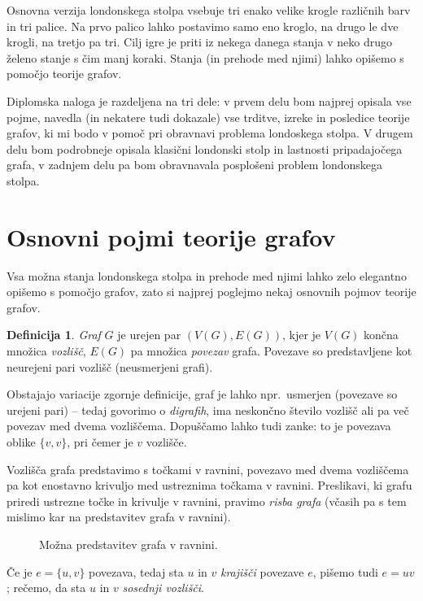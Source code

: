 \documentclass[12pt,a4paper]{amsart}
\theoremstyle{definition} %
\newtheorem{definicija}{Definicija}[section]
\theoremstyle{plain} %
\newcommand{\vozlisca}[1][G]{\ensuremath{V(#1)}}
\newcommand{\povezave}[1][G]{\ensuremath{E(#1)}}
\begin{document}
Osnovna verzija londonskega stolpa vsebuje tri enako velike krogle različnih barv in tri palice. Na prvo palico lahko postavimo samo eno kroglo, na drugo le dve krogli, na tretjo pa tri. Cilj igre je priti iz nekega danega stanja v neko drugo želeno stanje s čim manj koraki. Stanja (in prehode med njimi) lahko opišemo s pomočjo teorije grafov.

Diplomska naloga je razdeljena na tri dele: v prvem delu bom najprej opisala vse pojme, navedla (in nekatere tudi dokazale) vse trditve, izreke in posledice teorije grafov, ki mi bodo v pomoč pri obravnavi problema londoskega stolpa. V drugem delu bom podrobneje opisala klasični londonski stolp in lastnosti pripadajočega grafa, v zadnjem delu pa bom obravnavala posplošeni problem londonskega stolpa.


\section{Osnovni pojmi teorije grafov}

Vsa možna stanja londonskega stolpa in prehode med njimi lahko zelo elegantno opišemo s pomočjo grafov, zato si najprej poglejmo nekaj osnovnih pojmov teorije grafov.

\begin{definicija}
	\emph{Graf} $G$ je urejen par $(\vozlisca, \povezave)$, kjer je $\vozlisca$ končna množica \emph{vozlišč}, $\povezave$ pa množica \emph{povezav} grafa. Povezave so predstavljene kot neurejeni pari vozlišč (neusmerjeni grafi).
\end{definicija}

Obstajajo variacije zgornje definicije, graf je lahko npr.\ usmerjen (povezave so urejeni pari) -- tedaj govorimo o \emph{digrafih}, ima neskončno število vozlišč ali pa več povezav med dvema vozliščema. Dopuščamo lahko tudi zanke: to je povezava oblike $\{v,v\}$, pri čemer je $v$ vozlišče.

Vozlišča grafa predstavimo s točkami v ravnini, povezavo med dvema vozliščema pa kot enostavno krivuljo med ustreznima točkama v ravnini. Preslikavi, ki grafu priredi ustrezne točke in krivulje v ravnini, pravimo \emph{risba grafa} (včasih pa s tem mislimo kar na predstavitev grafa v ravnini).

\begin{figure}[h]
    \caption{Možna predstavitev grafa v ravnini.}
\end{figure}
    
Če je $e = \{ u,v \}$ povezava, tedaj sta $u$ in $v$ \emph{krajišči} povezave $e$, pišemo tudi $e = uv$; rečemo, da sta $u$ in $v$ \emph{sosednji vozlišči}.
\end{document}
